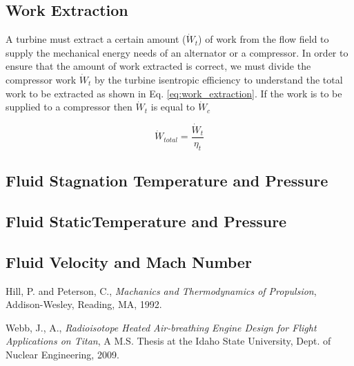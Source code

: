\subsection{Work Extraction}
A turbine must extract a certain amount ($\dot{W}_t$) of work from the flow field to supply the mechanical energy needs of an alternator
or a compressor.  In order to ensure that the amount of work extracted is correct, we must divide the compressor work $\dot{W}_t$ by 
the turbine isentropic efficiency to understand the total work to be extracted as shown in Eq. \ref{eq:work_extraction}.  If the work 
is to be supplied to a compressor then $\dot{W}_t$ is equal to $\dot{W}_c$

\begin{equation}
\label{eq:work_extraction}
\dot{W}_{total} = \frac{\dot{W}_t}{\eta_t}
\end{equation}


\subsection{Fluid Stagnation Temperature and Pressure}

\subsection{Fluid StaticTemperature and Pressure}

\subsection{Fluid Velocity and Mach Number}

\begin{thebibliography}{2}

 Hill, P. and Peterson, C., \emph{Machanics and Thermodynamics of Propulsion}, Addison-Wesley, Reading, MA, 1992.

 Webb, J., A., \emph{Radioisotope Heated Air-breathing Engine Design for Flight Applications on Titan}, A M.S. Thesis at
                         the Idaho State University, Dept. of Nuclear Engineering, 2009.
\end{thebibliography}